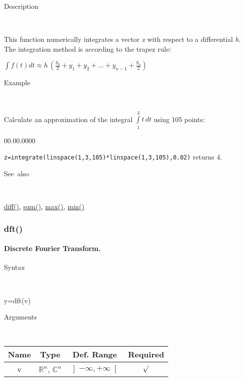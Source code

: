 \begin{description}
\item [Description]~
\end{description}
This function numerically integrates a vector \textit{x} with respect
to a differential \textit{h}. The integration method is according
to the trapez rule:

\medskip{}
$\int f\left(t\right)dt\approx h\,\left({\displaystyle \frac{y_{0}}{2}}+y_{1}+y_{2}+\ldots+y_{n-1}+{\displaystyle \frac{y_{n}}{2}}\right)$
\medskip{}

\begin{description}
\item [Example]~
\end{description}
Calculate an approximation of the integral $\int\limits _{1}^{3}t\, dt$
using 105 points:

\begin{lyxlist}{00.00.0000}
\item [\texttt{z=integrate(linspace(1,3,105){*}linspace(1,3,105),0.02)}]returns
4.
\end{lyxlist}
\begin{description}
\item [See~also]~
\end{description}
\textcolor{blue}{\hyperlink{diff}{diff()}}\textcolor{black}{,} \textcolor{blue}{\hyperlink{sum}{sum()}}\textcolor{black}{,}
\textcolor{blue}{\hyperlink{max}{max()}}\textcolor{black}{,} \textcolor{blue}{\hyperlink{min}{min()}}


\newpage
{}


\subsubsection*{\hypertarget{dft}{}{\Large dft()}}


\paragraph{\label{par:Discrete-Fourier-Transform}Discrete Fourier Transform.}

\begin{description}
\item [Syntax]~
\end{description}
y=dft(v)

\begin{description}
\item [Arguments]~
\end{description}
\begin{tabular}{|c|c|c|c|}
\hline 
Name&
Type&
Def. Range&
Required\tabularnewline
\hline
\hline 
v&
$\mathbb{R}^{n}$, $\mathbb{C}^{n}$&
$\left]-\infty,+\infty\right[$&
$\surd$\tabularnewline
\hline 
\end{tabular}

